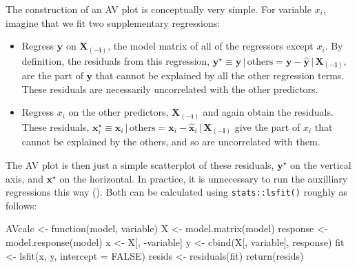 \documentclass[
  letterpaper,
  10pt,
  krantz2]{krantz}
\makeatletter
\newenvironment{Shaded}{\begin{snugshade}}{\end{snugshade}}
\newcommand{\AttributeTok}[1]{\textcolor[rgb]{0.40,0.45,0.13}{#1}}
\newcommand{\ConstantTok}[1]{\textcolor[rgb]{0.56,0.35,0.01}{#1}}
\newcommand{\ControlFlowTok}[1]{\textcolor[rgb]{0.00,0.23,0.31}{#1}}
\newcommand{\FunctionTok}[1]{\textcolor[rgb]{0.28,0.35,0.67}{#1}}
\newcommand{\NormalTok}[1]{\textcolor[rgb]{0.00,0.23,0.31}{#1}}
\newcommand{\OtherTok}[1]{\textcolor[rgb]{0.00,0.23,0.31}{#1}}
\newcommand{\SpecialCharTok}[1]{\textcolor[rgb]{0.37,0.37,0.37}{#1}}
\newenvironment{kframe}{%
  \medskip{}
  \setlength{\fboxsep}{.8em}
  \def\at@end@of@kframe{}%
  \ifinner\ifhmode%
  \def\at@end@of@kframe{\end{minipage}}%
  \begin{minipage}{\columnwidth}%
  \fi\fi%
  \def\FrameCommand##1{\hskip\@totalleftmargin \hskip-\fboxsep
  \colorbox{shadecolor}{##1}\hskip-\fboxsep
      \hskip-\linewidth \hskip-\@totalleftmargin \hskip\columnwidth}%
  \MakeFramed {\advance\hsize-\width
    \@totalleftmargin\z@ \linewidth\hsize
    \@setminipage}}%
{\par\unskip\endMakeFramed%
  \at@end@of@kframe}
\renewenvironment{Shaded}{\begin{kframe}}{\end{kframe}}
\makeatother
\begin{document}
The construction of an AV plot is conceptually very simple. For variable
\(x_i\), imagine that we fit two supplementary regressions:

\begin{itemize}
\item
  Regress \(\mathbf{y}\) on \(\mathbf{X_{(-i)}}\), the model matrix of
  all of the regressors except \(x_i\). By definition, the residuals
  from this regression,
  \(\mathbf{y}^\star \equiv \mathbf{y} \,\vert\, \text{others} = \mathbf{y} - \widehat{\mathbf{y}} \,\vert\, \mathbf{X_{(-i)}}\),
  are the part of \(\mathbf{y}\) that cannot be explained by all the
  other regression terms. These residuals are necessarily uncorrelated
  with the other predictors.
\item
  Regress \(x_i\) on the other predictors, \(\mathbf{X_{(-i)}}\) and
  again obtain the residuals. These residuals,
  \(\mathbf{x}_i^\star \equiv \mathbf{x}_i \,\vert\, \text{others} = \mathbf{x}_i - \widehat{\mathbf{x}}_i \,\vert\, \mathbf{X_{(-i)}}\)
  give the part of \(x_i\) that cannot be explained by the others, and
  so are uncorrelated with them.
\end{itemize}

The AV plot is then just a simple scatterplot of these residuals,
\(\mathbf{y}^\star\) on the vertical axis, and \(\mathbf{x}^\star\) on
the horizontal. In practice, it is unnecessary to run the auxilliary
regressions this way (). Both can be calculated using \texttt{stats::lsfit()} roughly as
follows:

\begin{Shaded}
\begin{Highlighting}[]
\NormalTok{AVcalc }\OtherTok{\textless{}{-}} \ControlFlowTok{function}\NormalTok{(model, variable)}
\NormalTok{X }\OtherTok{\textless{}{-}} \FunctionTok{model.matrix}\NormalTok{(model)}
\NormalTok{response }\OtherTok{\textless{}{-}} \FunctionTok{model.response}\NormalTok{(model)}
\NormalTok{x }\OtherTok{\textless{}{-}}\NormalTok{ X[, }\SpecialCharTok{{-}}\NormalTok{variable]}
\NormalTok{y }\OtherTok{\textless{}{-}} \FunctionTok{cbind}\NormalTok{(X[, variable], response)}
\NormalTok{fit }\OtherTok{\textless{}{-}} \FunctionTok{lsfit}\NormalTok{(x, y, }\AttributeTok{intercept =} \ConstantTok{FALSE}\NormalTok{)}
\NormalTok{resids }\OtherTok{\textless{}{-}} \FunctionTok{residuals}\NormalTok{(fit)}
\FunctionTok{return}\NormalTok{(resids)}
\end{Highlighting}
\end{Shaded}
\end{document}

